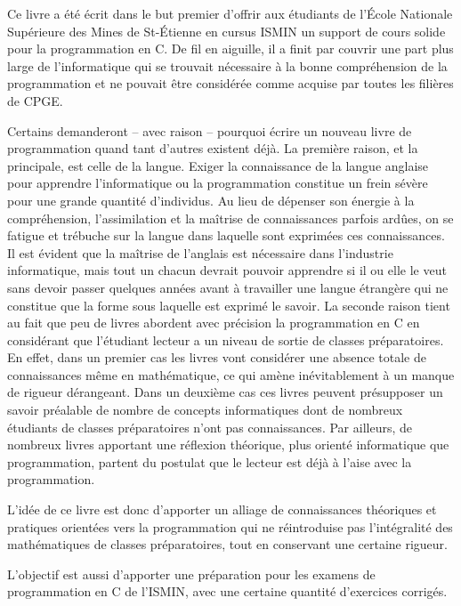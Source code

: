 \documentclass[../main.tex]{subfiles}
\begin{document}
Ce livre a été écrit dans le but premier d'offrir aux étudiants de l'École Nationale Supérieure des
Mines de St-Étienne en cursus ISMIN un support de cours solide pour la programmation en C. De fil
en aiguille, il a finit par couvrir une part plus large de l'informatique qui se trouvait nécessaire à la
bonne compréhension de la programmation et ne pouvait être considérée comme acquise par toutes les
filières de CPGE.

Certains demanderont -- avec raison -- pourquoi écrire un nouveau livre de programmation quand tant d'autres existent déjà. La première raison, et la principale, est celle de la langue. Exiger la connaissance de la langue anglaise pour apprendre l'informatique ou la programmation constitue un frein sévère pour une grande quantité d'individus. Au lieu de dépenser son énergie à la compréhension, l'assimilation et la maîtrise de connaissances parfois ardûes, on se fatigue et trébuche sur la langue dans laquelle sont exprimées ces connaissances. Il est évident que la maîtrise de l'anglais est nécessaire dans l'industrie informatique, mais tout un chacun devrait pouvoir apprendre si il ou elle le veut sans devoir passer quelques années avant à travailler une langue étrangère qui ne constitue que la forme sous laquelle est exprimé le savoir. La seconde raison tient au fait que peu de livres abordent avec précision la programmation en C en considérant que l'étudiant lecteur a un niveau de sortie de classes préparatoires. En effet, dans un premier cas les livres vont considérer une absence totale de connaissances même en mathématique, ce qui amène inévitablement à un manque de rigueur dérangeant. Dans un deuxième cas ces livres peuvent présupposer un savoir préalable de nombre de concepts informatiques dont de nombreux étudiants de classes préparatoires n'ont pas connaissances. Par ailleurs, de nombreux livres apportant une réflexion théorique, plus orienté informatique que programmation, partent du postulat que le lecteur est déjà à l'aise avec la programmation.

L'idée de ce livre est donc d'apporter un alliage de connaissances théoriques et pratiques orientées vers la programmation qui ne réintroduise pas l'intégralité des mathématiques de classes préparatoires, tout en conservant une certaine rigueur.

L'objectif est aussi d'apporter une préparation pour les examens de programmation en C de l'ISMIN, avec une certaine quantité d'exercices corrigés.

\end{document}
